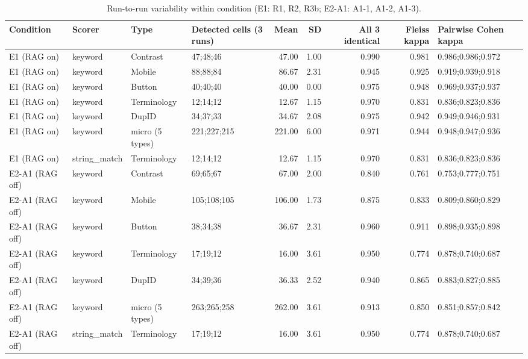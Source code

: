 \begin{table}[t]
\centering
\small
\caption{Run-to-run variability within condition (E1: R1, R2, R3b; E2-A1: A1-1, A1-2, A1-3).}
\label{tab:e7-variability}
\begin{tabular}{llllrrrrl}
\toprule
Condition & Scorer & Type & Detected cells (3 runs) & Mean & SD & All 3 identical & Fleiss kappa & Pairwise Cohen kappa \\
\midrule
E1 (RAG on) & keyword & Contrast & 47;48;46 & 47.00 & 1.00 & 0.990 & 0.981 & 0.986;0.986;0.972 \\
E1 (RAG on) & keyword & Mobile & 88;88;84 & 86.67 & 2.31 & 0.945 & 0.925 & 0.919;0.939;0.918 \\
E1 (RAG on) & keyword & Button & 40;40;40 & 40.00 & 0.00 & 0.975 & 0.948 & 0.969;0.937;0.937 \\
E1 (RAG on) & keyword & Terminology & 12;14;12 & 12.67 & 1.15 & 0.970 & 0.831 & 0.836;0.823;0.836 \\
E1 (RAG on) & keyword & DupID & 34;37;33 & 34.67 & 2.08 & 0.975 & 0.942 & 0.949;0.946;0.931 \\
E1 (RAG on) & keyword & micro (5 types) & 221;227;215 & 221.00 & 6.00 & 0.971 & 0.944 & 0.948;0.947;0.936 \\
E1 (RAG on) & string\_match & Terminology & 12;14;12 & 12.67 & 1.15 & 0.970 & 0.831 & 0.836;0.823;0.836 \\
E2-A1 (RAG off) & keyword & Contrast & 69;65;67 & 67.00 & 2.00 & 0.840 & 0.761 & 0.753;0.777;0.751 \\
E2-A1 (RAG off) & keyword & Mobile & 105;108;105 & 106.00 & 1.73 & 0.875 & 0.833 & 0.809;0.860;0.829 \\
E2-A1 (RAG off) & keyword & Button & 38;34;38 & 36.67 & 2.31 & 0.960 & 0.911 & 0.898;0.935;0.898 \\
E2-A1 (RAG off) & keyword & Terminology & 17;19;12 & 16.00 & 3.61 & 0.950 & 0.774 & 0.878;0.740;0.687 \\
E2-A1 (RAG off) & keyword & DupID & 34;39;36 & 36.33 & 2.52 & 0.940 & 0.865 & 0.883;0.827;0.885 \\
E2-A1 (RAG off) & keyword & micro (5 types) & 263;265;258 & 262.00 & 3.61 & 0.913 & 0.850 & 0.851;0.857;0.842 \\
E2-A1 (RAG off) & string\_match & Terminology & 17;19;12 & 16.00 & 3.61 & 0.950 & 0.774 & 0.878;0.740;0.687 \\
\bottomrule
\end{tabular}
\end{table}
